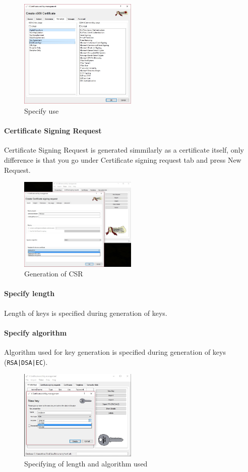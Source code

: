 \documentclass[10pt, a4paper]{report}
\begin{document}
\begin{figure}[!ht]
 \caption{Specify use}
 \centering
  \includegraphics[width=0.5\textwidth]{../Dependancies/XCA/genKey_specif.jpg}
\end{figure}


      \paragraph{Certificate Signing Request}
Certificate Signing Request is generated simmilarly as a certificate itself, only difference is that you go under Certificate signing request tab and press New Request.
\begin{figure}[!ht]
 \caption{Generation of CSR}
 \centering
  \includegraphics[width=0.5\textwidth]{../Dependancies/XCA/newCSR.jpg}
\end{figure}

      \paragraph{Specify length}
Length of keys is specified during generation of keys.
      \paragraph{Specify algorithm}
Algorithm used for key generation is specified during generation of keys (\verb+RSA|DSA|EC+).
\begin{figure}[!ht]
 \caption{Specifying of length and algorithm used}
 \centering
  \includegraphics[width=0.5\textwidth]{../Dependancies/XCA/genKeylength.jpg}
\end{figure}
\end{document}

